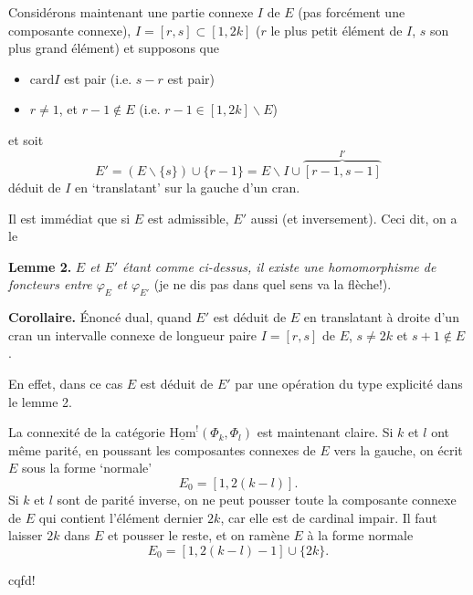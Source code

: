 \documentclass[11pt]{article}
\newcommand{\msp}[1]{\marginpar{\footnotesize [#1]}}
\newcommand{\card}{\mathrm{card}}
\newcommand{\uHom}{\underline{\mathrm{Hom}}}
\begin{document}
Considérons maintenant une partie connexe $I$ de $E$ (pas forcément une composante connexe), $I=[r,s]\subset[1,2k]$ ($r$ le plus petit élément de $I$, $s$ son plus grand élément) et supposons que

\begin{itemize}
\item[a)] $\card I$ est pair (i.e. $s-r$ est pair)
\item[b)] $r\neq1$, et $r-1\notin E$ (i.e. $r-1\in[1,2k]\backslash E$)
\end{itemize}

et soit
\[
E'=(E\backslash\{s\})\cup\{r-1\}=E\backslash I\cup\overbrace{[r-1,s-1]}^{I'}
\]
déduit de $I$ en `translatant' sur la gauche d'un cran.

\msp{page 21}
Il est immédiat que si $E$ est admissible, $E'$ aussi (et inversement). Ceci dit, on a le

\textbf{Lemme 2.} \textit{$E$ et $E'$ étant comme ci-dessus, il existe une homomorphisme de foncteurs entre $\varphi_E$ et $\varphi_{E'}$} (je ne dis pas dans quel sens va la flèche!). %

\textbf{Corollaire.} Énoncé dual, quand $E'$ est déduit de $E$ en translatant à droite d'un cran un intervalle connexe de longueur paire $I=[r,s]$ de $E$, $s\neq2k$ et $s+1\notin E$.

En effet, dans ce cas $E$ est déduit de $E'$ par une opération du type explicité dans le lemme 2.

La connexité de la catégorie $\uHom^{!}(\Phi_k,\Phi_l)$ est maintenant claire. Si $k$ et $l$ ont même parité, en poussant les composantes connexes de $E$ vers la gauche, on écrit $E$ sous la forme `normale'
\[
E_0=[1,2(k-l)].
\]
Si $k$ et $l$ sont de parité inverse, on ne peut pousser toute la composante connexe de $E$ qui contient l'élément dernier $2k$, car elle est de cardinal impair. Il faut laisser $2k$ dans $E$ et pousser le reste, et on ramène $E$ à la forme normale
\[
E_0=[1,2(k-l)-1]\cup\{2k\}.
\]

\hfill cqfd!
\end{document}
